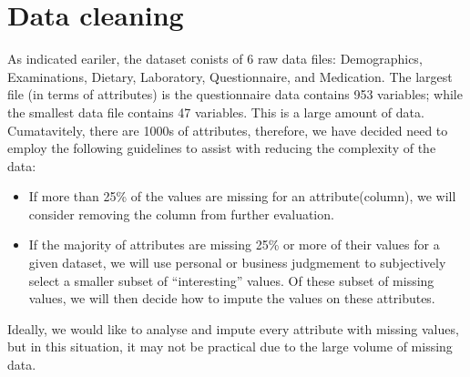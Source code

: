 \documentclass[]{article}
\providecommand{\tightlist}{%
  \setlength{\itemsep}{0pt}\setlength{\parskip}{0pt}}
\begin{document}
\hypertarget{data-cleaning}{%
\section{Data cleaning}\label{data-cleaning}}

As indicated eariler, the dataset conists of 6 raw data files:
Demographics, Examinations, Dietary, Laboratory, Questionnaire, and
Medication. The largest file (in terms of attributes) is the
questionnaire data contains 953 variables; while the smallest data file
contains 47 variables. This is a large amount of data. Cumatavitely,
there are 1000s of attributes, therefore, we have decided need to employ
the following guidelines to assist with reducing the complexity of the
data:

\begin{itemize}
\tightlist
\item
  If more than 25\% of the values are missing for an attribute(column),
  we will consider removing the column from further evaluation.
\item
  If the majority of attributes are missing 25\% or more of their values
  for a given dataset, we will use personal or business judgmement to
  subjectively select a smaller subset of ``interesting'' values. Of
  these subset of missing values, we will then decide how to impute the
  values on these attributes.
\end{itemize}

Ideally, we would like to analyse and impute every attribute with
missing values, but in this situation, it may not be practical due to
the large volume of missing data.
\end{document}
